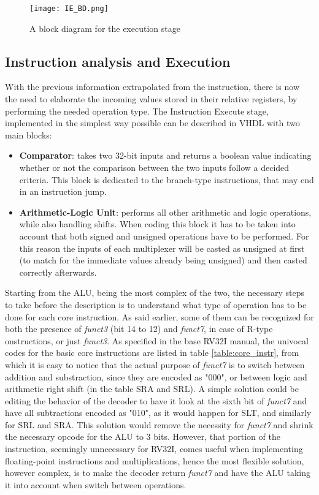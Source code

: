 \begin{figure}[ht]
    \centering
    \texttt{[image: IE\_BD.png]}
    \caption{A block diagram for the execution stage}
    \label{fig:IE_BD}
\end{figure}

\subsection{Instruction analysis and Execution}
With the previous information extrapolated from the instruction, there is now the need to elaborate the incoming values stored in their relative registers, by performing the needed operation type.
The Instruction Execute stage, implemented in the simplest way possible can be described in VHDL with two main blocks:
\begin{itemize}
\item \textbf{Comparator}: takes two 32-bit inputs and returns a boolean value indicating whether or not the comparison between the two inputs follow a decided criteria. This block is dedicated to the branch-type instructions, that may end in an instruction jump.
\item \textbf{Arithmetic-Logic Unit}: performs all other arithmetic and logic operations, while also handling shifts. When coding this block it has to be taken into account that both signed and unsigned operations have to be performed. For this reason the inputs of each multiplexer will be casted as unsigned at first (to match for the immediate values already being unsigned) and then casted correctly afterwards. 
\end{itemize}
Starting from the ALU, being the most complex of the two, the necessary steps to take before the description is to understand what type of operation has to be done for each core instruction. As said earlier, some of them can be recognized for both the presence of \emph{funct3} (bit 14 to 12) and \emph{funct7}, in case of R-type onstructions, or just \emph{funct3}. As specified in the base RV32I manual, the univocal codes for the basic core instructions are listed in table \ref{table:core_instr}, from which it is easy to notice that the actual purpose of \emph{funct7} is to switch between addition and substraction, since they are encoded as "000", or between logic and arithmetic right shift (in the table SRA and SRL). A simple solution could be editing the behavior of the decoder to have it look at the sixth bit of \emph{funct7} and have all subtractions encoded as "010", as it would happen for SLT, and similarly for SRL and SRA. This solution would remove the necessity for \emph{funct7} and shrink the necessary opcode for the ALU to 3 bits. However, that portion of the instruction, seemingly unnecessary for RV32I, comes useful when implementing floating-point instructions and multiplications, hence the most flexible solution, however complex, is to make the decoder return \emph{funct7} and have the ALU taking it into account when switch between operations.
